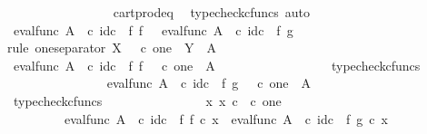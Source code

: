 \begin{isabellebody}
\ \ \ \ \ \ \ \ \ \ \ \ \ \ \isamarkupfalse%
\ \ cart{\isacharunderscore}{\kern0pt}prod{\isacharunderscore}{\kern0pt}eq{}\ \isamarkupfalse%
\ {\isacharparenleft}{\kern0pt}typecheck{\isacharunderscore}{\kern0pt}cfuncs{\isacharcomma}{\kern0pt}\ auto{\isacharparenright}{\kern0pt}\isanewline
\ \ \ \ \ \ \ \ \ \ \ \ \isamarkupfalse%
\ {\isachardoublequoteopen}eval{\isacharunderscore}{\kern0pt}func\ A\ {\isasymOmega}\ {\isasymcirc}\isactrlsub c\ id\isactrlsub c\ {\isasymOmega}\ {\isasymtimes}\isactrlsub f\ f\ \ {\isacharequal}{\kern0pt}\ eval{\isacharunderscore}{\kern0pt}func\ A\ {\isasymOmega}\ {\isasymcirc}\isactrlsub c\ id\isactrlsub c\ {\isasymOmega}\ {\isasymtimes}\isactrlsub f\ g{\isachardoublequoteclose}\isanewline
\ \ \ \ \ \ \ \ \ \ \ \ \isamarkupfalse%
{\isacharparenleft}{\kern0pt}rule\ one{\isacharunderscore}{\kern0pt}separator{\isacharbrackleft}{\kern0pt}\ X\ {\isacharequal}{\kern0pt}\ {\isachardoublequoteopen}{\isasymOmega}\ {\isasymtimes}\isactrlsub c\ one{\isachardoublequoteclose}{\isacharcomma}{\kern0pt}\ \ Y\ {\isacharequal}{\kern0pt}\ A{\isacharbrackright}{\kern0pt}{\isacharparenright}{\kern0pt}\isanewline
\ \ \ \ \ \ \ \ \ \ \ \ \ \ \isamarkupfalse%
\ {\isachardoublequoteopen}eval{\isacharunderscore}{\kern0pt}func\ A\ {\isasymOmega}\ {\isasymcirc}\isactrlsub c\ id\isactrlsub c\ {\isasymOmega}\ {\isasymtimes}\isactrlsub f\ f\ {\isacharcolon}{\kern0pt}\ {\isasymOmega}\ {\isasymtimes}\isactrlsub c\ one\ {\isasymrightarrow}\ A{\isachardoublequoteclose}\isanewline
\ \ \ \ \ \ \ \ \ \ \ \ \ \ \ \ \isamarkupfalse%
\ typecheck{\isacharunderscore}{\kern0pt}cfuncs\isanewline
\ \ \ \ \ \ \ \ \ \ \ \ \ \ \isamarkupfalse%
\ {\isachardoublequoteopen}eval{\isacharunderscore}{\kern0pt}func\ A\ {\isasymOmega}\ {\isasymcirc}\isactrlsub c\ id\isactrlsub c\ {\isasymOmega}\ {\isasymtimes}\isactrlsub f\ g\ {\isacharcolon}{\kern0pt}\ {\isasymOmega}\ {\isasymtimes}\isactrlsub c\ one\ {\isasymrightarrow}\ A{\isachardoublequoteclose}\isanewline
\ \ \ \ \ \ \ \ \ \ \ \ \ \ \ \ \isamarkupfalse%
\ typecheck{\isacharunderscore}{\kern0pt}cfuncs\isanewline
\ \ \ \ \ \ \ \ \ \ \ \ \ \ \isamarkupfalse%
\ {\isachardoublequoteopen}{\isasymAnd}x{\isachardot}{\kern0pt}\ x\ {\isasymin}\isactrlsub c\ {\isasymOmega}\ {\isasymtimes}\isactrlsub c\ one\ {\isasymLongrightarrow}\isanewline
\ \ \ \ \ \ \ \ \ {\isacharparenleft}{\kern0pt}eval{\isacharunderscore}{\kern0pt}func\ A\ {\isasymOmega}\ {\isasymcirc}\isactrlsub c\ id\isactrlsub c\ {\isasymOmega}\ {\isasymtimes}\isactrlsub f\ f{\isacharparenright}{\kern0pt}\ {\isasymcirc}\isactrlsub c\ x\ {\isacharequal}{\kern0pt}\ {\isacharparenleft}{\kern0pt}eval{\isacharunderscore}{\kern0pt}func\ A\ {\isasymOmega}\ {\isasymcirc}\isactrlsub c\ id\isactrlsub c\ {\isasymOmega}\ {\isasymtimes}\isactrlsub f\ g{\isacharparenright}{\kern0pt}\ {\isasymcirc}\isactrlsub c\ x{\isachardoublequoteclose}\isanewline

\end{isabellebody}
